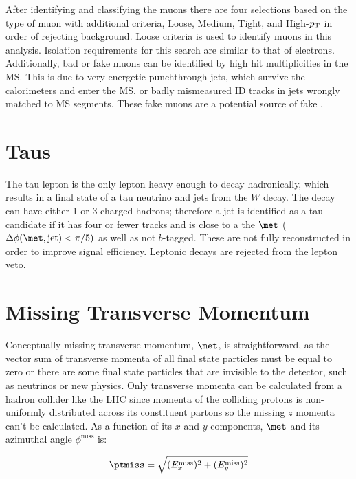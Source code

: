 After identifying and classifying the muons there are four selections based on the type of muon with additional criteria, Loose, Medium, Tight, and High-$p_{\mathrm{T}}$ in order of rejecting background.  Loose criteria is used to identify muons in this analysis.  Isolation requirements for this search are similar to that of electrons.  \\

Additionally, bad or fake muons can be identified by high hit multiplicities in the MS.  This is due to very energetic punchthrough jets, which survive the calorimeters and enter the MS, or badly mismeasured ID tracks in jets wrongly matched to MS segments.  These fake muons are a potential source of fake \met.

\section{Taus}

The tau lepton is the only lepton heavy enough to decay hadronically, which results in a final state of a tau neutrino and jets from the $W$ decay.  The decay can have either 1 or 3 charged hadrons; therefore a jet is identified as a tau candidate if it has four or fewer tracks and is close to a the $\met$ ($\Delta \phi (\met, \mathrm{jet}) < \pi/5)$ as well as not $b$-tagged.  These are not fully reconstructed in order to improve signal efficiency.  Leptonic decays are rejected from the lepton veto. \\


\section{Missing Transverse Momentum} \label{sec:met}

Conceptually missing transverse momentum, $\met$, is straightforward, as the vector sum of transverse momenta of all final state particles must be equal to zero or there are some final state particles that are invisible to the detector, such as neutrinos or new physics.  Only transverse momenta can be calculated from a hadron collider like the LHC since momenta of the colliding protons is non-uniformly distributed across its constituent partons so the missing $z$ momenta can't be calculated.  As a function of its $x$ and $y$ components, $\met$ and its azimuthal angle $\phi^{\mathrm{miss}}$ is:

\begin{equation}
\ptmiss = \sqrt{(E_{x}^{\mathrm{miss}})^2 + (E_{y}^{\mathrm{miss}})^2}
\end{equation}


